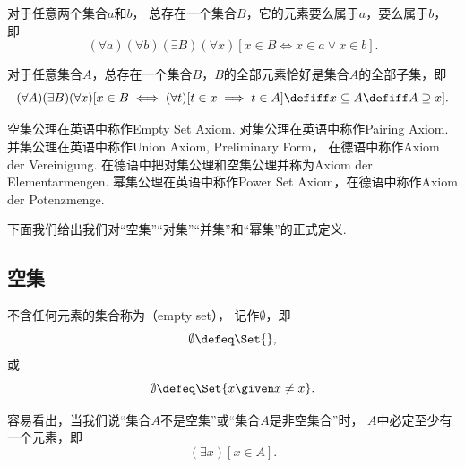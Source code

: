 \begin{axiom}[并集公理I]
对于任意两个集合\(a\)和\(b\)，
总存在一个集合\(B\)，它的元素要么属于\(a\)，要么属于\(b\)，即\begin{equation*}
	(\forall a)
	(\forall b)
	(\exists B)
	(\forall x)
	[
		x \in B
		\iff
		x \in a \lor x \in b
	].
\end{equation*}
\end{axiom}

\begin{axiom}[幂集公理]
对于任意集合\(A\)，总存在一个集合\(B\)，\(B\)的全部元素恰好是集合\(A\)的全部子集，即\begin{equation*}
	(\forall A)(\exists B)(\forall x)
	[
		x \in B
		\iff
		(\forall t)[t \in x \implies t \in A]
		\defiff
		x \subseteq A
		\defiff
		A \supseteq x
	].
\end{equation*}
\end{axiom}


空集公理在英语中称作Empty Set Axiom.
对集公理在英语中称作Pairing Axiom.
并集公理在英语中称作Union Axiom, Preliminary Form，
在德语中称作Axiom der Vereinigung.
在德语中把对集公理和空集公理并称为Axiom der Elementarmengen.
幂集公理在英语中称作Power Set Axiom，在德语中称作Axiom der Potenzmenge.

下面我们给出我们对“空集”“对集”“并集”和“幂集”的正式定义.

\subsection{空集}
\begin{definition}
不含任何元素的集合称为（empty set），
记作\(\emptyset\)，即
\begin{equation}
	\emptyset \defeq \Set{},
\end{equation}
或
\begin{equation}
	\emptyset \defeq \Set{ x \given x \neq x }.
\end{equation}
\end{definition}

容易看出，当我们说“集合\(A\)不是空集”或“集合\(A\)是非空集合”时，
\(A\)中必定至少有一个元素，即\begin{equation*}
	(\exists x)[x \in A].
\end{equation*}

